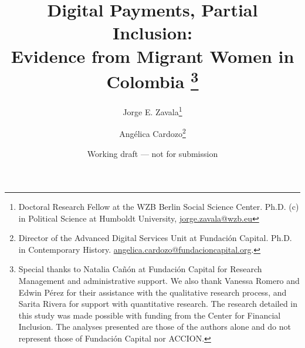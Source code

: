 \documentclass[12pt]{article}
\title{Digital Payments, Partial Inclusion:\\ Evidence from Migrant Women in Colombia%
  \thanks{Special thanks to Natalia Cañón at Fundación Capital for Research Management and administrative support. We also thank Vanessa Romero and Edwin Pérez for their assistance with the qualitative research process, and Sarita Rivera for support with quantitative research. The research detailed in this study was made possible with funding from the Center for Financial Inclusion. The analyses presented are those of the authors alone and do not represent those of Fundación Capital nor ACCION.}}
\author{Jorge E. Zavala\thanks{Doctoral Research Fellow at the WZB Berlin Social Science Center. Ph.D. (c) in Political Science at Humboldt University, \href{mailto:jorge.zavala@wzb.eu}{jorge.zavala@wzb.eu}}%
  \and Angélica Cardozo\thanks{Director of the Advanced Digital Services Unit at Fundación Capital. Ph.D. in Contemporary History. \href{mailto:angelica.cardozo@fundacioncapital.org}{angelica.cardozo@fundacioncapital.org}.}}
\date{Working draft --- not for submission}
\providecommand{\CFIPaperDir}{}
\begin{document}
\begingroup
\makeatletter
\renewcommand{\@fnsymbol}[1]{\ifcase#1\or\ensuremath{\dagger}\or 1\or 2\fi}
\maketitle
\endgroup












\newpage

\end{document}
